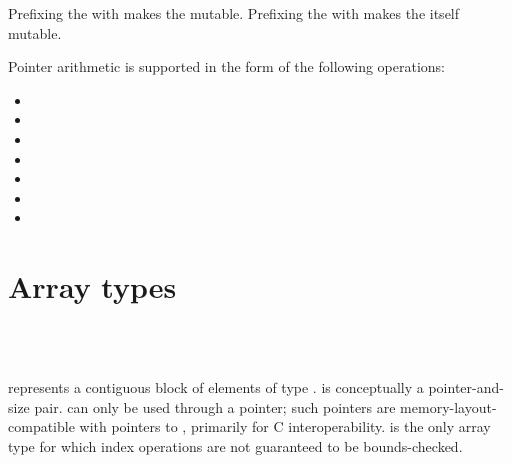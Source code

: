 Prefixing the  with  makes the
 mutable. Prefixing the \code{*} with 
makes the  itself mutable.

\begin{samepage}
Pointer arithmetic is supported in the form of the following operations:

\begin{itemize}
\item {} \code{+} 
\item {} \code{+=} 
\item {} \code{++}
\item {} \code{-} 
\item {} \code{-=} 
\item {} \code{--}
\item {} \code{-} 
\end{itemize}
\end{samepage}

\section{Array types}

\begin{grammar}
 \textrightarrow{}  \code{[}  \code{]}\\
 \textrightarrow{}  \code{[} \code{]}\\
 \textrightarrow{}  \code{[}  \code{]}
\end{grammar}

 represents a contiguous block of
 elements of type .
 is conceptually a pointer-and-size
pair.  can only be used through a
pointer; such pointers are memory-layout-compatible with pointers to
, primarily for C interoperability.
 is the only array type for which
index operations are not guaranteed to be bounds-checked.


